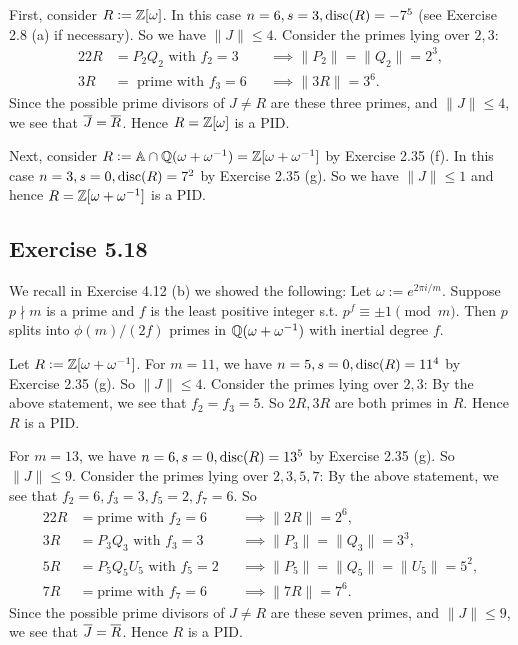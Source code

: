 \documentclass[../Marcus.tex]{subfiles}
\begin{document}
First, consider $R:=\mathbb{Z}[\omega]$. In this case $n=6,s=3,\operatorname{disc}(R) = -7^5$ (see Exercise 2.8 (a) if necessary). So we have $\|J\| \leq 4$. Consider the primes lying over $2,3$:
\begin{alignat*}{2}
2R &= P_2Q_2 \text{ with } f_2 = 3 &&\implies \|P_2\| = \|Q_2\| = 2^3,    \\
3R &= \text{ prime with } f_3 = 6 &&\implies \|3R\| = 3^6.
\end{alignat*}
Since the possible prime divisors of $J\neq R$ are these three primes, and $\|J\| \leq 4$, we see that $\overline{J}=\overline{R}$. Hence $R=\mathbb{Z}[\omega]$ is a PID.

Next, consider $R:=\mathbb{A}\cap\mathbb{Q}(\omega+\omega^{-1})=\mathbb{Z}[\omega+\omega^{-1}]$ by Exercise 2.35 (f). In this case $n=3,s=0,\operatorname{disc}(R) = 7^2$ by Exercise 2.35 (g). So we have $\|J\| \leq 1$ and hence $R=\mathbb{Z}[\omega+\omega^{-1}]$ is a PID.

\subsection*{Exercise 5.18}

We recall in Exercise 4.12 (b) we showed the following: Let $\omega:=e^{2\pi i/m}$. Suppose $p\nmid m$ is a prime and $f$ is the least positive integer s.t. $p^f \equiv \pm1\pmod{m}$. Then $p$ splits into $\phi(m)/(2f)$ primes in $\mathbb{Q}(\omega+\omega^{-1})$ with inertial degree $f$.

Let $R:=\mathbb{Z}[\omega+\omega^{-1}]$. For $m=11$, we have $n=5,s=0,\operatorname{disc}(R) = 11^4$ by Exercise 2.35 (g). So $\|J\| \leq 4$. Consider the primes lying over $2,3$: By the above statement, we see that $f_2=f_3=5$. So $2R,3R$ are both primes in $R$. Hence $R$ is a PID.

For $m=13$, we have $n=6,s=0,\operatorname{disc}(R) = 13^5$ by Exercise 2.35 (g). So $\|J\| \leq 9$. Consider the primes lying over $2,3,5,7$: By the above statement, we see that $f_2=6,f_3=3,f_5=2,f_7=6$. So
\begin{alignat*}{2}
2R &= \text{prime with } f_2 = 6     &&\implies \|2R\| = 2^6,       \\
3R &= P_3Q_3 \text{ with } f_3=3  &&\implies \|P_3\|=\|Q_3\|=3^3,       \\
5R &= P_5Q_5U_5 \text{ with } f_5=2  &&\implies \|P_5\|=\|Q_5\|=\|U_5\|=5^2,     \\
7R &= \text{prime with } f_7 = 6     &&\implies \|7R\| = 7^6.
\end{alignat*}
Since the possible prime divisors of $J\neq R$ are these seven primes, and $\|J\| \leq 9$, we see that $\overline{J}=\overline{R}$. Hence $R$ is a PID.
\end{document}
